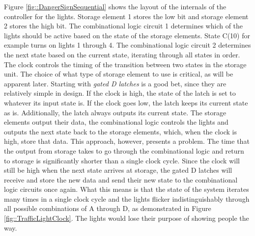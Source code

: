 Figure \ref{fig::DangerSignSequential} shows the layout of the internals of the controller for the lights. Storage element 1 stores the low bit and storage element 2 stores the high bit. The combinational logic circuit 1 determines which of the lights should be active based on the state of the storage elements. State C(10) for example turns on lights 1 through 4. The combinational logic circuit 2 determines the next state based on the current state, iterating through all states in order. The clock controls the timing of the transition between two states in the storage unit. The choice of what type of storage element to use is critical, as will be apparent later. Starting with \emph{gated D latches} is a good bet, since they are relatively simple in design. If the clock is high, the state of the latch is set to whatever its input state is. If the clock goes low, the latch keeps its current state as is. Additionally, the latch always outputs its current state. The storage elements output their data, the combinational logic controls the lights and outputs the next state back to the storage elements, which, when the clock is high, store that data.
\newline
This approach, however, presents a problem. The time that the output from storage takes to go through the combinational logic and return to storage is significantly shorter than a single clock cycle. Since the clock will still be high when the next state arrives at storage, the gated D latches will receive and store the new data and send their new state to the combinational logic circuits once again. What this means is that the state of the system iterates many times in a single clock cycle and the lights flicker indistinguishably through all possible combinations of A through D, as demonstrated in Figure \ref{fig::TrafficLightClock}. The lights would lose their purpose of showing people the way.
\newline

